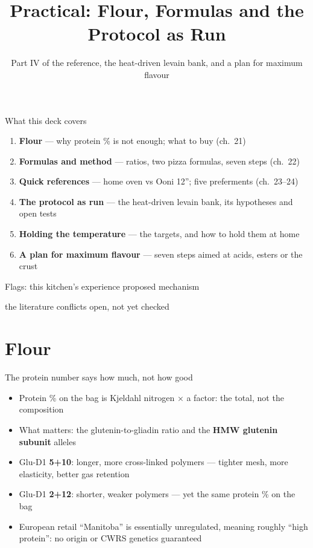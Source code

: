 \documentclass[aspectratio=169,11pt]{beamer}
\title[Practical]{Practical: Flour, Formulas and the Protocol as Run}
\subtitle{Part IV of the reference, the heat-driven levain bank, and a plan for maximum flavour}
\begin{document}
\begin{frame}[plain]\titlepage\end{frame}

\begin{frame}{What this deck covers}
  \begin{enumerate}
    \item \textbf{Flour} --- why protein \% is not enough; what to buy (ch.~21)
    \item \textbf{Formulas and method} --- ratios, two pizza formulas, seven steps (ch.~22)
    \item \textbf{Quick references} --- home oven vs Ooni 12”; five preferments (ch.~23--24)
    \item \textbf{The protocol as run} --- the heat-driven levain bank, its hypotheses and open tests
    \item \textbf{Holding the temperature} --- the targets, and how to hold them at home
    \item \textbf{A plan for maximum flavour} --- seven steps aimed at acids, esters or the crust
  \end{enumerate}
  \medskip
  {\small Flags:\quad \ownresult{} this kitchen's experience \quad \hypothesis{} proposed mechanism\par
  \phantom{Flags:}\quad \contested{} the literature conflicts \quad \untested{} open, not yet checked\par}
\end{frame}

\section{Flour}

\begin{frame}{The protein number says how much, not how good}
  \begin{itemize}
    \item Protein \% on the bag is Kjeldahl nitrogen × a factor: the total, not the composition
    \item What matters: the glutenin-to-gliadin ratio and the \textbf{HMW glutenin subunit} alleles
    \item Glu-D1 \textbf{5+10}: longer, more cross-linked polymers --- tighter mesh, more elasticity, better gas retention
    \item Glu-D1 \textbf{2+12}: shorter, weaker polymers --- yet the same protein \% on the bag
    \item European retail “Manitoba” is essentially unregulated, meaning roughly “high protein”: no origin or CWRS genetics guaranteed
  \end{itemize}
\end{frame}
\end{document}
